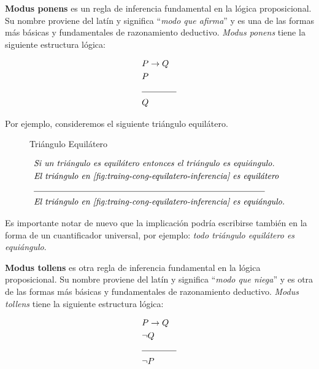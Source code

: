 \textbf{Modus ponens} es un regla de inferencia fundamental en la lógica proposicional. Su nombre proviene del latín y significa ``\textit{modo que afirma}'' y es una de las formas más básicas y fundamentales de razonamiento deductivo. \textit{Modus ponens} tiene la siguiente estructura lógica:

\begin{equation*}
    \begin{split}
        & P \rightarrow Q \\
        & P \\
        & \text{\noindent\rule{4em}{0.4pt}} \\
        & Q
    \end{split}
\end{equation*}

Por ejemplo, consideremos el siguiente triángulo equilátero. 

\begin{figure}[!h]
    \centering
    
    \caption{Triángulo Equilátero}            
    \label{fig:traing-cong-equilatero-inferencia}
\end{figure}

\begin{equation*}
    \begin{split}
        & \textit{Si un triángulo es equilátero entonces el triángulo es equiángulo.} \\
        & \textit{El triángulo en \cref{fig:traing-cong-equilatero-inferencia} es equilátero} \\
        & \text{\noindent\rule{27em}{0.4pt}} \\
        & \textit{El triángulo en \cref{fig:traing-cong-equilatero-inferencia} es equiángulo.}
    \end{split}
\end{equation*}

Es importante notar de nuevo que la implicación podría escribirse también en la forma de un cuantificador universal, por ejemplo: \textit{todo triángulo equilátero es equiángulo}.

\textbf{Modus tollens} es otra regla de inferencia fundamental en la lógica proposicional. Su nombre proviene del latín y significa ``\textit{modo que niega}'' y es otra de las formas más básicas y fundamentales de razonamiento deductivo. \textit{Modus tollens} tiene la siguiente estructura lógica:

\begin{equation*}
    \begin{split}
        & P \rightarrow Q \\
        & \neg Q \\
        & \text{\noindent\rule{4em}{0.4pt}} \\
        & \neg P
    \end{split}
\end{equation*}

